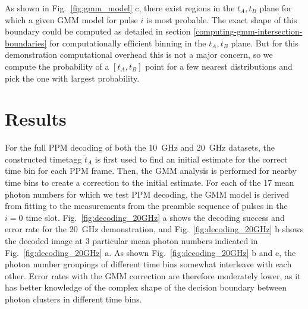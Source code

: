 \documentclass[11pt]{caltech_thesis} %
\begin{document}
As shown in Fig.~\ref{fig:gmm_model} c, there exist regions in the $t_A, t_B$ plane for which a given GMM model for pulse $i$ is most probable. The exact shape of this boundary could be computed as detailed in section \ref{computing-gmm-intersection-boundaries} for computationally efficient binning in the $t_A, t_B$ plane. But for this demonstration computational overhead this is not a major concern, so we compute the probability of a $[t_A, t_B]$ point for a few nearest distributions and pick the one with largest probability.

\hypertarget{results-1}{%
\section{Results}\label{results-1}}

For the full PPM decoding of both the 10~GHz and 20~GHz datasets, the constructed timetagg $\tilde{t}_A$ is first used to find an initial estimate for the correct time bin for each PPM frame. Then, the GMM analysis is performed for nearby time bins to create a correction to the initial estimate. For each of the 17 mean photon numbers for which we test PPM decoding, the GMM model is derived from fitting to the measurements from the preamble sequence of pulses in the $i = 0$ time slot. Fig.~\ref{fig:decoding_20GHz} a shows the decoding success and error rate for the 20~GHz demonstration, and Fig.~\ref{fig:decoding_20GHz} b shows the decoded image at 3 particular mean photon numbers indicated in Fig.~\ref{fig:decoding_20GHz} a. As shown Fig.~\ref{fig:decoding_20GHz} b and c, the photon number groupings of different time bins somewhat interleave with each other. Error rates with the GMM correction are therefore moderately lower, as it has better knowledge of the complex shape of the decision boundary between photon clusters in different time bins.
\end{document}
